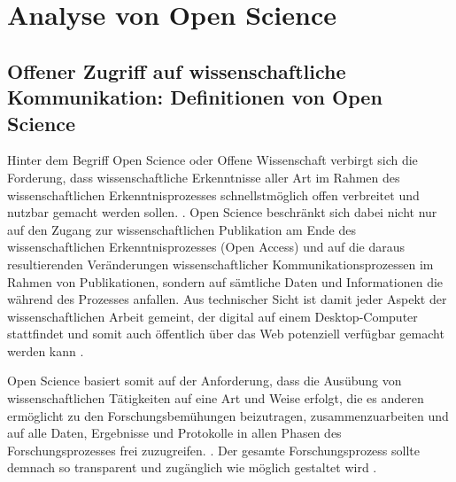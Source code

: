 \section{Analyse von Open Science}

\subsection{Offener Zugriff auf wissenschaftliche Kommunikation: Definitionen von Open Science}

Hinter dem Begriff Open Science oder Offene Wissenschaft verbirgt sich die Forderung, dass wissenschaftliche Erkenntnisse aller Art im Rahmen des wissenschaftlichen Erkenntnisprozesses schnellstmöglich offen verbreitet und nutzbar gemacht werden sollen. \cite{stafford_2010_science}. Open Science beschränkt sich dabei nicht nur auf den Zugang zur wissenschaftlichen Publikation am Ende des wissenschaftlichen Erkenntnisprozesses (Open Access) und auf die daraus resultierenden Veränderungen wissenschaftlicher Kommunikationsprozessen im Rahmen von Publikationen, sondern auf sämtliche Daten und Informationen die während des Prozesses anfallen. Aus technischer Sicht ist damit jeder Aspekt der wissenschaftlichen Arbeit gemeint, der digital auf einem Desktop-Computer stattfindet und somit auch öffentlich über das Web potenziell verfügbar gemacht werden kann \cite{mietchen2012wissenschaft}.

Open Science basiert somit auf der Anforderung, dass die Ausübung von wissenschaftlichen Tätigkeiten auf eine Art und Weise erfolgt, die es anderen ermöglicht zu den Forschungsbemühungen beizutragen, zusammenzuarbeiten und auf alle Daten, Ergebnisse und Protokolle in allen Phasen des Forschungsprozesses frei zuzugreifen. \cite{http://www.rin.ac.uk/our-work/data-management-and-curation/open-science-case-studies}. Der gesamte Forschungsprozess sollte demnach so transparent und zugänglich wie möglich gestaltet wird \cite{Scheliga_2014}.

